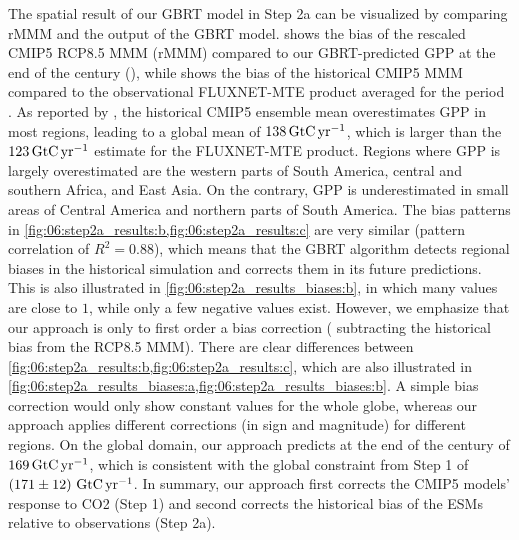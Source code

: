 The spatial result of our \ac{GBRT} model in Step 2a can be visualized by
comparing r\acs{MMM} and the output of the \acs{GBRT} model.
 shows the bias of the rescaled \acs{CMIP}5
\acs{RCP}8.5 \ac{MMM} (r\acs{MMM}) compared to our \acs{GBRT}-predicted
\ac{GPP} at the end of the  century (), while
 shows the bias of the historical \acs{CMIP}5
\ac{MMM} compared to the observational FLUXNET-MTE product \autocite{Jung2011}
averaged for the period . As reported by \textcite{Anav2013},
the historical \acs{CMIP}5 ensemble mean overestimates \ac{GPP} in most
regions, leading to a global mean of $138 \unit{\GtCyr{}}$, which is larger
than the $123 \unit{\GtCyr{}}$ estimate for the FLUXNET-MTE product. Regions
where \ac{GPP} is largely overestimated are the western parts of South America,
central and southern Africa, and East Asia. On the contrary, \ac{GPP} is
underestimated in small areas of Central America and northern parts of South
America. The bias patterns in
\cref{fig:06:step2a_results:b,fig:06:step2a_results:c} are very similar
(pattern correlation of $R^2 = 0.88$), which means that the \ac{GBRT} algorithm
detects regional biases in the historical simulation and corrects them in its
future predictions. This is also illustrated in
\cref{fig:06:step2a_results_biases:b}, in which many values are close to $1$,
while only a few negative values exist. However, we emphasize that our approach
is only to first order a bias correction (\ie{} subtracting the historical bias
from the \acs{RCP}8.5 \ac{MMM}). There are clear differences between
\cref{fig:06:step2a_results:b,fig:06:step2a_results:c}, which are also
illustrated in
\cref{fig:06:step2a_results_biases:a,fig:06:step2a_results_biases:b}. A simple
bias correction would only show constant values for the whole globe, whereas
our approach applies different corrections (in sign and magnitude) for
different regions. On the global domain, our approach predicts  at the
end of the century of $169 \unit{\GtCyr{}}$, which is consistent with the
global constraint from Step 1 of $\pmrangeunit{171}{12}{\GtCyr{}}$. In summary,
our approach first corrects the \acs{CMIP}5 models' response to \ac{CO2} (Step
1) and second corrects the historical bias of the \acp{ESM} relative to
observations (Step 2a).

